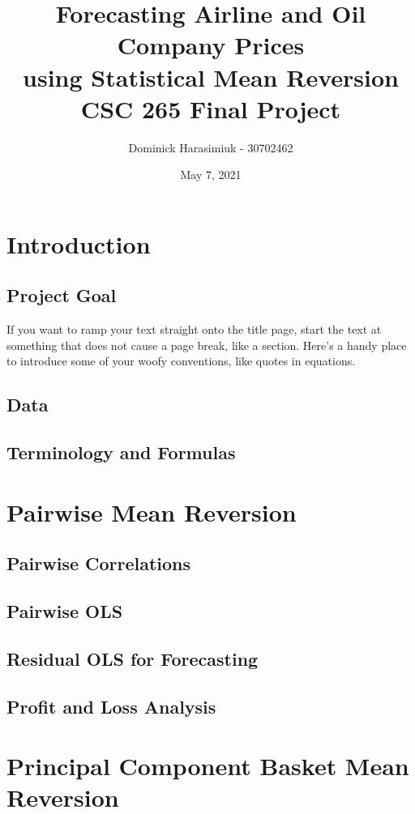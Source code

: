 \documentclass{article}
\title{Forecasting Airline and Oil Company Prices \\
using Statistical Mean Reversion \\
\large CSC 265 Final Project}
\author{Dominick Harasimiuk - 30702462}
\date{May 7, 2021}
\begin{document}
\maketitle

\vspace{1cm}

\begin{abstract}
\noindent
\lipsum[1]
\end{abstract}

\newpage
\section{Introduction}
\subsection{Project Goal}
If you want to ramp your text straight onto the title page, start the text at 
something that does not cause a page break, like a section.  Here's a handy 
place to introduce some of your woofy conventions, like quotes in equations.
\subsection{Data}
\subsection{Terminology and Formulas}

\section{Pairwise Mean Reversion}
\subsection{Pairwise Correlations}
\subsection{Pairwise OLS}
\subsection{Residual OLS for Forecasting}
\subsection{Profit and Loss Analysis}

\section{Principal Component Basket Mean Reversion}
\end{document}
